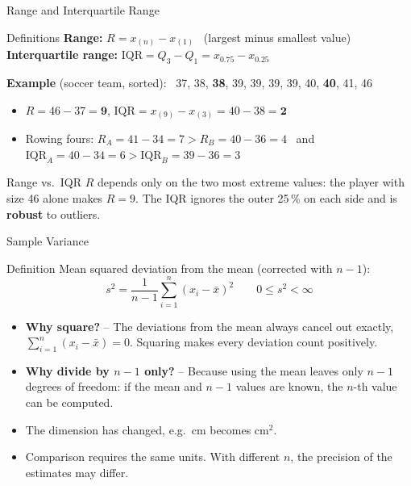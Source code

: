 \documentclass[aspectratio=169,11pt]{beamer}
\begin{document}
\begin{frame}{Range and Interquartile Range}
  \begin{block}{Definitions}
    \textbf{Range:} \quad $R = x_{(n)} - x_{(1)}$ \ (largest minus smallest value)\\[3pt]
    \textbf{Interquartile range:} \quad $\text{IQR} = Q_3 - Q_1 = x_{0.75} - x_{0.25}$
  \end{block}

  \textbf{Example} (soccer team, sorted): \ 37, 38, \textbf{38}, 39, 39, 39, 39, 40, \textbf{40}, 41, 46
  \begin{itemize}
    \item $R = 46 - 37 = \mathbf{9}$, \quad $\text{IQR} = x_{(9)} - x_{(3)} = 40 - 38 = \mathbf{2}$
    \item Rowing fours: $R_A = 41 - 34 = 7 > R_B = 40 - 36 = 4$ \ and \
          $\text{IQR}_A = 40 - 34 = 6 > \text{IQR}_B = 39 - 36 = 3$
  \end{itemize}
  \begin{alertblock}{Range vs.\ IQR}
    $R$ depends only on the two most extreme values: the player with size 46 alone makes
    $R = 9$. The IQR ignores the outer 25\,\% on each side and is \textbf{robust} to outliers.
  \end{alertblock}
\end{frame}

\begin{frame}{Sample Variance}
  \begin{block}{Definition}
    Mean squared deviation from the mean (corrected with $n-1$):
    \[ s^2 = \frac{1}{n-1}\sum_{i=1}^{n}(x_i - \bar{x})^2 \qquad 0 \leq s^2 < \infty \]
  \end{block}
  \begin{itemize}
    \item \textbf{Why square?} -- The deviations from the mean always cancel out exactly,
      $\sum_{i=1}^{n}(x_i - \bar{x}) = 0$. Squaring makes every deviation count positively.
    \item \textbf{Why divide by $n-1$ only?} -- Because using the mean leaves only $n-1$ degrees of freedom:
      if the mean and $n-1$ values are known, the $n$-th value can be computed.
    \item The dimension has changed, e.g.\ cm becomes cm$^2$.
    \item Comparison requires the same units. With different $n$, the precision of the estimates may differ.
  \end{itemize}
\end{frame}
\end{document}
